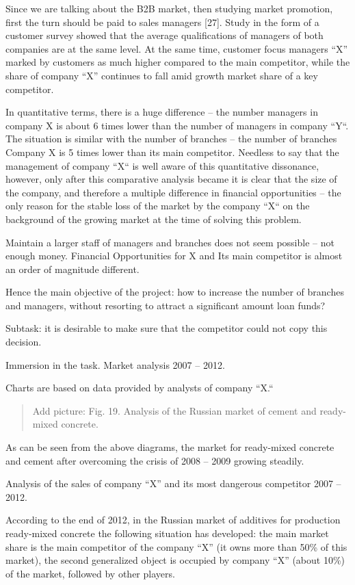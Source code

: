 \documentclass[11pt,a4paper]{book}
\newcommand{\addpicture}[1]{
  \begin{quote} Add picture: #1\end{quote}
}
\begin{document}
Since we are talking about the B2B market, then studying market promotion,
first the turn should be paid to sales managers [27]. Study in the form of a
customer survey showed that the average qualifications of managers of both
companies are at the same level. At the same time, customer focus managers “X”
marked by customers as much higher compared to the main competitor, while the
share of company “X” continues to fall amid growth market share of a key
competitor.

In quantitative terms, there is a huge difference -- the number managers in
company X is about 6 times lower than the number of managers in company “Y“.
The situation is similar with the number of branches -- the number of branches
Company X is 5 times lower than its main competitor. Needless to say that the
management of company “X“ is well aware of this quantitative dissonance,
however, only after this comparative analysis became it is clear that the size
of the company, and therefore a multiple difference in financial opportunities
-- the only reason for the stable loss of the market by the company “X“ on the
background of the growing market at the time of solving this problem.

Maintain a larger staff of managers and branches does not seem possible -- not
enough money. Financial Opportunities for X and Its main competitor is almost
an order of magnitude different.

Hence the main objective of the project: how to increase the number of
branches and managers, without resorting to attract a significant amount loan
funds?

Subtask: it is desirable to make sure that the competitor could not copy
this decision.

Immersion in the task. Market analysis 2007 -- 2012.

Charts are based on data provided by analysts of company “X.“

\addpicture{Fig. 19. Analysis of the Russian market of cement and ready-mixed
  concrete.}

As can be seen from the above diagrams, the market for ready-mixed concrete
and cement after overcoming the crisis of 2008 -- 2009 growing steadily.

Analysis of the sales of company “X” and its most dangerous competitor 2007 --
2012.

According to the end of 2012, in the Russian market of additives for
production ready-mixed concrete the following situation has developed: the
main market share is the main competitor of the company “X” (it owns more than
50\% of this market), the second generalized object is occupied by company “X” (about 10\%)
of the market, followed by other players.
\end{document}
